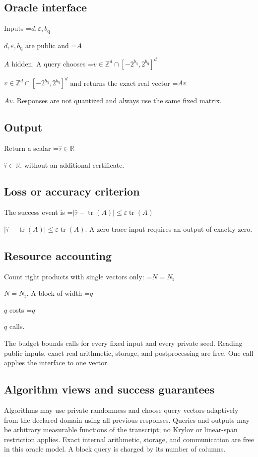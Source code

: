 \documentclass[10pt,a4paper]{article}
\newcommand{\AtlasMath}[1]{\par\begingroup\centering\setbox0=\hbox{$\displaystyle #1$}\ifdim\wd0>1.4\linewidth\typeout{ATLAS WIDE FORMULA: \the\wd0}\fi\ifdim\wd0>\linewidth\resizebox{\linewidth}{!}{\box0}\else\box0\fi\par\endgroup}
\newcommand{\AtlasInlineMath}[1]{\begingroup\setbox0=\hbox{$#1$}\ifdim\wd0>.4\linewidth\endgroup\AtlasMath{#1}\else\endgroup$#1$\fi}
\begin{document}
\subsection{Oracle interface}
Inputs \AtlasInlineMath{d,\varepsilon,b_{\mathrm{q}}} are public and \AtlasInlineMath{A} hidden. A query chooses \AtlasInlineMath{v\in\mathbb{Z}^d\cap[-2^{b_{\mathrm{q}}},2^{b_{\mathrm{q}}}]^d} and returns the exact real vector \AtlasInlineMath{Av}. Responses are not quantized and always use the same fixed matrix.

\subsection{Output}
Return a scalar \AtlasInlineMath{\widehat\tau\in\mathbb R}, without an additional certificate.

\subsection{Loss or accuracy criterion}
The success event is \AtlasInlineMath{|\widehat\tau-\operatorname{tr}(A)|\le\varepsilon\operatorname{tr}(A)}. A zero-trace input requires an output of exactly zero.

\subsection{Resource accounting}
Count right products with single vectors only: \AtlasInlineMath{N=N_{\mathrm r}}. A block of width \AtlasInlineMath{q} costs \AtlasInlineMath{q} calls.

The budget bounds calls for every fixed input and every private seed. Reading public inputs, exact real arithmetic, storage, and postprocessing are free. One call applies the interface to one vector.

\subsection{Algorithm views and success guarantees}
Algorithms may use private randomness and choose query vectors adaptively from the declared domain using all previous responses. Queries and outputs may be arbitrary measurable functions of the transcript; no Krylov or linear-span restriction applies. Exact internal arithmetic, storage, and communication are free in this oracle model. A block query is charged by its number of columns.
\end{document}

